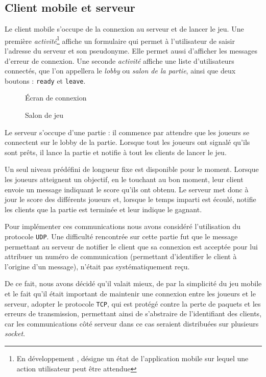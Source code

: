 \subsection{Client mobile et serveur}
Le client mobile s'occupe de la connexion au serveur et de lancer le jeu.
Une première \textit{activité}\footnote{En développement \android{}, désigne un état de l'application mobile sur lequel une action utilisateur peut être attendue} affiche un formulaire qui permet à l'utilisateur de saisir l'adresse du serveur et son pseudonyme. Elle permet aussi d'afficher les messages d'erreur de connexion. Une seconde \textit{activité} affiche une liste d'utilisateurs connectés, que l'on appellera le \textit{lobby} ou \textit{salon de la partie}, ainsi que deux boutons : \verb!ready! et \verb!leave!.

\begin{figure}
 \begin{minipage}[b]{.46\linewidth}
  \centering{}
  \caption{Écran de connexion}
 \end{minipage} \hfill
 \begin{minipage}[b]{.46\linewidth}
  \centering{}
  \caption{Salon de jeu}
 \end{minipage}
\end{figure}

Le serveur s'occupe d'une partie : il commence par attendre que les joueurs se connectent sur le lobby de la partie. Lorsque tout les joueurs ont signalé qu'ils sont prêts, il lance la partie et notifie à tout les clients de lancer le jeu.

Un seul niveau prédéfini de longueur fixe est disponible pour le moment. Lorsque les joueurs atteignent un objectif, en le touchant au bon moment, leur client envoie un message indiquant le score qu'ils ont obtenu. Le serveur met donc à jour le score des différents joueurs et, lorsque le temps imparti est écoulé, notifie les clients que la partie est terminée et leur indique le gagnant.

Pour implémenter ces communications nous avons considéré l'utilisation du protocole \verb!UDP!. Une difficulté rencontrée sur cette partie fut que le message permettant au serveur de notifier le client que sa connexion est acceptée pour lui attribuer un numéro de communication (permettant d'identifier le client à l'origine d'un message), n'était pas systématiquement reçu. 

De ce fait, nous avons décidé qu'il valait mieux, de par la simplicité du jeu mobile et le fait qu'il était important de maintenir une connexion entre les joueurs et le serveur, adopter le protocole \verb!TCP!, qui est protégé contre la perte de paquets et les erreurs de transmission, permettant ainsi de s'abstraire de l'identifiant des clients, car les communications côté serveur dans ce cas seraient distribuées sur plusieurs \textit{socket}.
